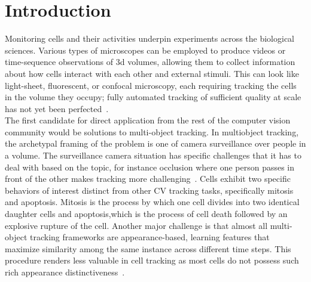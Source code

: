 \section{Introduction}
\label{sec:intro}


Monitoring cells and their activities underpin experiments across the biological sciences.  Various types of microscopes can be employed to produce videos or time-sequence observations of 3d volumes, allowing them to collect information about how cells interact with each other and external stimuli.  This can look like light-sheet, fluorescent, or confocal microscopy, each requiring tracking the cells in the volume they occupy; fully automated tracking of sufficient quality at scale has not yet been perfected~\cite{mavska2023cell}.\\

The first candidate for direct application from the rest of the computer vision community would be solutions to multi-object tracking.  In multiobject tracking, the archetypal framing of the problem is one of camera surveillance over people in a volume.  The surveillance camera situation has specific challenges that it has to deal with based on the topic, for instance occlusion where one person passes in front of the other makes tracking more challenging~\cite{luo2021multiple}.  Cells exhibit two specific behaviors of interest distinct from other CV tracking tasks, specifically mitosis and apoptosis. Mitosis is the process by which one cell divides into two identical daughter cells and apoptosis,which is the process of cell death followed by an explosive rupture of the cell. Another major challenge is that almost all multi-object tracking frameworks are appearance-based, learning features that maximize similarity among the same instance across different time steps. This procedure renders less valuable in cell tracking as most cells do not possess such rich appearance distinctiveness~\cite{mavska2023cell}. \\

